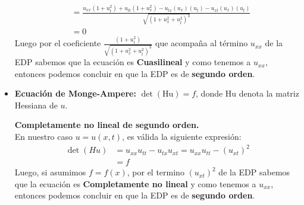 \begin{homeworkProblem}
\begin{itemize}
\begin{solucion}
\begin{align*}
            &=\frac{u_{xx}(1+u_t^2)+u_{tt}(1+u_x^2)-u_{tx}(u_x)(u_t)-u_{xt}(u_x)(u_t)}{\sqrt{(1+u_x^2+u_t^2)^3}}\\
            &=0
        \end{align*}
        Luego por el coeficiente $\frac{(1+u_t^2)}{\sqrt{(1+u_x^2+u_t^2)^3}}$ que acompaña al término $u_{xx}$ de la EDP sabemos que la ecuación es \textbf{Cuasilineal} y como tenemos a $u_{xx}$, entonces podemos concluir en que la EDP es de \textbf{segundo orden}.
    \end{solucion}
\newpage
\item \textbf{Ecuación de Monge-Ampere:} $\operatorname{det}(\mathrm{Hu})=f$, donde $\mathrm{Hu}$ denota la matriz Hessiana de $u$.
    \begin{solucion}
        \textbf{Completamente no lineal de segundo orden.}\\
        En nuestro caso $u=u(x,t)$, es válida la siguiente expresión:
        \begin{align*}
            \operatorname{det}(Hu)&=u_{xx}u_{tt}-u_{tx}u_{xt}=u_{xx}u_{tt}-(u_{xt})^2\\
            &=f
        \end{align*}
        Luego, si asumimos $f=f(x)$, por el termino $(u_{xt})^2$ de la EDP sabemos que la ecuación es \textbf{Completamente no lineal} y como tenemos a $u_{xx}$, entonces podemos concluir en que la EDP es de \textbf{segundo orden}.\\ 
    \end{solucion}

\end{itemize}
\end{homeworkProblem}
\newpage
